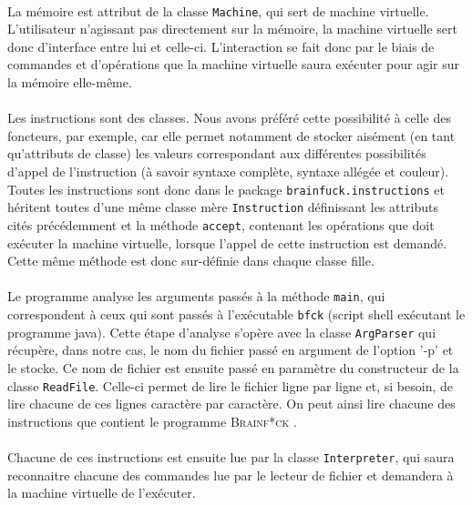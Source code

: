 \documentclass[a4paper]{article}
\begin{document}
\paragraph{}La mémoire est attribut de la classe \texttt{Machine}, qui sert de machine virtuelle.
L'utilisateur n'agissant pas directement sur la mémoire, la machine virtuelle sert donc d'interface entre lui et celle-ci. L'interaction se fait donc par le biais de commandes et d'opérations que la machine virtuelle saura exécuter pour agir sur la mémoire elle-même.
\paragraph{}Les instructions sont des classes. Nous avons préféré cette possibilité à celle des foncteurs, par exemple, car elle permet notamment de stocker aisément (en tant qu'attributs de classe) les valeurs correspondant aux différentes possibilités d'appel de l'instruction (à savoir syntaxe complète, syntaxe allégée et couleur).
Toutes les instructions sont donc dans le package \texttt{brainfuck.instructions} et héritent toutes d'une même classe mère \texttt{Instruction} définissant les attributs cités précédemment et la méthode \texttt{accept}, contenant les opérations que doit exécuter la machine virtuelle, lorsque l'appel de cette instruction est demandé. Cette même méthode est donc sur-définie dans chaque classe fille.
\paragraph{}Le programme analyse les arguments passés à la méthode \texttt{main}, qui correspondent à ceux qui sont passés à l'exécutable \texttt{bfck} (script shell exécutant le programme java). Cette étape d'analyse s'opère avec la classe \texttt{ArgParser} qui récupère, dans notre cas, le nom du fichier passé en argument de l'option '-p' et le stocke.
Ce nom de fichier est ensuite passé en paramètre du constructeur de la classe \texttt{ReadFile}. Celle-ci permet de lire le fichier ligne par ligne et, si besoin, de lire chacune de ces lignes caractère par caractère. On peut ainsi lire chacune des instructions que contient le programme \textsc{Brainf*ck} .
\paragraph{}Chacune de ces instructions est ensuite lue par la classe \texttt{Interpreter}, qui saura reconnaitre chacune des commandes lue par le lecteur de fichier et demandera à la machine virtuelle de l'exécuter.
\end{document}
